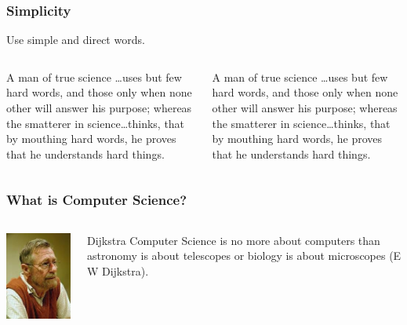 \documentclass[11pt]{beamer}
\begin{document}
\begin{frame}
  \frametitle{Simplicity}
  Use simple and direct words.
  \begin{columns}
    \begin{column}{.45\textwidth}
      \begin{block}{}
        A man of true science \ldots uses but few hard words, and
        those only when none other will answer his purpose; whereas
        the smatterer in science\ldots thinks, that by mouthing hard
        words, he proves that he understands hard things.
      \end{block}
    \end{column}
    \begin{column}{.45\textwidth}
        A man of true science \ldots uses but few hard words,
        and those only when none other will answer his purpose;
        whereas the smatterer in science\ldots thinks, that by
        mouthing hard words, he proves that he understands hard
        things.
    \end{column}
  \end{columns}
\end{frame}

\begin{frame}
  \frametitle{What is Computer Science?}
  \begin{columns}
    \begin{column}{.5\textwidth}
    \begin{center}
      \includegraphics[scale=.5]{dijkstra.jpeg}
    \end{center}      
    \end{column}
    \begin{column}{.5\textwidth}
      \begin{exampleblock}{Dijkstra}
        Computer Science is no more about computers than
        astronomy is about telescopes or biology is about
        microscopes (E W Dijkstra).
      \end{exampleblock}
    \end{column}
  \end{columns}
\end{frame}
\end{document}

